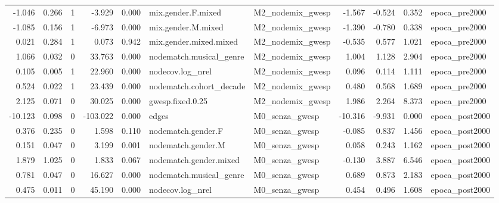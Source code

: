 \begin{table}
\begin{tabular}{rrrrrllrrrl}
   -1.046 & 0.266 &        1 &   -3.929 &     0.000 &      mix.gender.F.mixed & M2\_nodemix\_gwesp &  -1.567 &  -0.524 &   0.352 &               epoca\_pre2000 \\
   -1.085 & 0.156 &        1 &   -6.973 &     0.000 &      mix.gender.M.mixed & M2\_nodemix\_gwesp &  -1.390 &  -0.780 &   0.338 &               epoca\_pre2000 \\
    0.021 & 0.284 &        1 &    0.073 &     0.942 &  mix.gender.mixed.mixed & M2\_nodemix\_gwesp &  -0.535 &   0.577 &   1.021 &               epoca\_pre2000 \\
    1.066 & 0.032 &        0 &   33.763 &     0.000 & nodematch.musical\_genre & M2\_nodemix\_gwesp &   1.004 &   1.128 &   2.904 &               epoca\_pre2000 \\
    0.105 & 0.005 &        1 &   22.960 &     0.000 &        nodecov.log\_nrel & M2\_nodemix\_gwesp &   0.096 &   0.114 &   1.111 &               epoca\_pre2000 \\
    0.524 & 0.022 &        1 &   23.439 &     0.000 & nodematch.cohort\_decade & M2\_nodemix\_gwesp &   0.480 &   0.568 &   1.689 &               epoca\_pre2000 \\
    2.125 & 0.071 &        0 &   30.025 &     0.000 &        gwesp.fixed.0.25 & M2\_nodemix\_gwesp &   1.986 &   2.264 &   8.373 &               epoca\_pre2000 \\
  -10.123 & 0.098 &        0 & -103.022 &     0.000 &                   edges &   M0\_senza\_gwesp & -10.316 &  -9.931 &   0.000 &              epoca\_post2000 \\
    0.376 & 0.235 &        0 &    1.598 &     0.110 &      nodematch.gender.F &   M0\_senza\_gwesp &  -0.085 &   0.837 &   1.456 &              epoca\_post2000 \\
    0.151 & 0.047 &        0 &    3.199 &     0.001 &      nodematch.gender.M &   M0\_senza\_gwesp &   0.058 &   0.243 &   1.162 &              epoca\_post2000 \\
    1.879 & 1.025 &        0 &    1.833 &     0.067 &  nodematch.gender.mixed &   M0\_senza\_gwesp &  -0.130 &   3.887 &   6.546 &              epoca\_post2000 \\
    0.781 & 0.047 &        0 &   16.627 &     0.000 & nodematch.musical\_genre &   M0\_senza\_gwesp &   0.689 &   0.873 &   2.183 &              epoca\_post2000 \\
    0.475 & 0.011 &        0 &   45.190 &     0.000 &        nodecov.log\_nrel &   M0\_senza\_gwesp &   0.454 &   0.496 &   1.608 &              epoca\_post2000 \\

\end{tabular}
\end{table}
